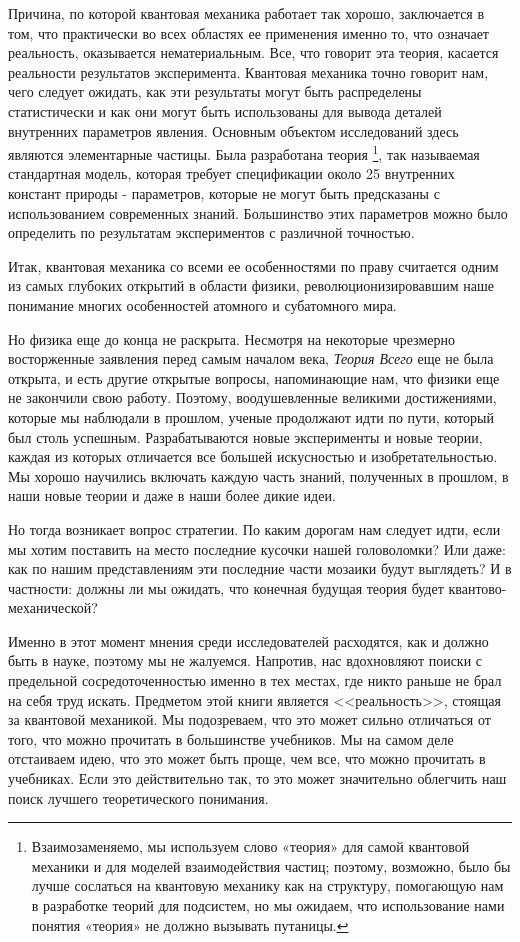 \documentclass[main.tex]{subfiles}
\begin{document}
Причина, по которой квантовая механика работает так хорошо, заключается в том, что практически во всех областях ее применения именно то, что означает реальность, оказывается нематериальным. Все, что говорит эта теория, касается реальности результатов эксперимента. Квантовая механика точно говорит нам, чего следует ожидать, как эти результаты могут быть распределены статистически и как они могут быть использованы для вывода деталей внутренних параметров явления. Основным объектом исследований здесь являются элементарные частицы. Была разработана теория \footnote{Взаимозаменяемо, мы используем слово «теория» для самой квантовой механики и для моделей взаимодействия частиц; поэтому, возможно, было бы лучше сослаться на квантовую механику как на структуру, помогающую нам в разработке теорий для подсистем, но мы ожидаем, что использование нами понятия «теория» не должно вызывать путаницы.}, так называемая стандартная модель, которая требует спецификации около 25 внутренних констант природы - параметров, которые не могут быть предсказаны с использованием современных знаний. Большинство этих параметров можно было определить по результатам экспериментов с различной точностью. 

Итак, квантовая механика со всеми ее особенностями по праву считается одним из самых глубоких открытий в области физики, революционизировавшим наше понимание многих особенностей атомного и субатомного мира. 

Но физика еще до конца не раскрыта. Несмотря на некоторые чрезмерно восторженные заявления перед самым началом века, \textit{Теория Всего} еще не была открыта, и есть другие открытые вопросы, напоминающие нам, что физики еще не закончили свою работу. Поэтому, воодушевленные великими достижениями, которые мы наблюдали в прошлом, ученые продолжают идти по пути, который был столь успешным. Разрабатываются новые эксперименты и новые теории, каждая из которых отличается все большей искусностью и изобретательностью. Мы хорошо научились включать каждую часть знаний, полученных в прошлом, в наши новые теории и даже в наши более дикие идеи. 

Но тогда возникает вопрос стратегии. По каким дорогам нам следует идти, если мы хотим поставить на место последние кусочки нашей головоломки? Или даже: как по нашим представлениям эти последние части мозаики будут выглядеть? И в частности: должны ли мы ожидать, что конечная будущая теория будет квантово-механической? 

Именно в этот момент мнения среди исследователей расходятся, как и должно быть в науке, поэтому мы не жалуемся. Напротив, нас вдохновляют поиски с предельной сосредоточенностью именно в тех местах, где никто раньше не брал на себя труд искать. Предметом этой книги является <<реальность>>, стоящая за квантовой механикой. Мы подозреваем, что это может сильно отличаться от того, что можно прочитать в большинстве учебников. Мы на самом деле отстаиваем идею, что это может быть проще, чем все, что можно прочитать в учебниках. Если это действительно так, то это может значительно облегчить наш поиск лучшего теоретического понимания. 
\end{document}
